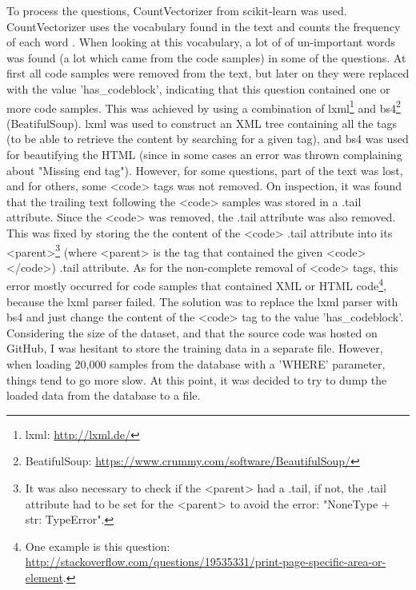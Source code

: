 \noindent
To process the questions, CountVectorizer from scikit-learn was used. 
CountVectorizer uses the vocabulary found in the text and counts the frequency of each word \cite{Scikitlearn.org2016b} \cite[see~4.2.3]{Scikitlearn.org2016}. 
When looking at this vocabulary, a lot of of un-important words was found (a lot which came from the code samples) in some of the questions. 
At first all code samples were removed from the text, but later on they were replaced with the value 'has\_codeblock', indicating that this question contained one or more code samples. 
This was achieved by using a combination of lxml\footnote{lxml: \url{http://lxml.de/}} and bs4\footnote{BeatifulSoup: \url{https://www.crummy.com/software/BeautifulSoup/}} (BeatifulSoup). 
lxml was used to construct an XML tree containing all the tags (to be able to retrieve the content by searching for a given tag), and bs4 was used for beautifying the HTML 
(since in some cases an error was thrown complaining about "Missing end tag").
\vspace{0.5em}\newline
However, for some questions, part of the text was lost, and for others, some <code> tags was not removed. 
On inspection, it was found that the trailing text following the <code> samples was stored in a .tail attribute. 
Since the <code> was removed, the .tail attribute was also removed. 
This was fixed by storing the the content of the <code> .tail attribute into its <parent>\footnote{
	It was also necessary to check if the <parent> had a .tail, if not, the .tail attribute had to be set for the <parent> to avoid the error: 
	"NoneType + str: TypeError".
	} 
(where <parent> is the tag that contained the given <code></code>) .tail attribute. 
As for the non-complete removal of <code> tags, this error mostly occurred for code samples that contained XML or HTML code\footnote{
	One example is this question: \\
	\url{http://stackoverflow.com/questions/19535331/print-page-specific-area-or-element}.
	}, 
because the lxml parser failed. 
The solution was to replace the lxml parser with bs4 and just change the content of the <code> tag to the value 'has\_codeblock'.
\vspace{0.5em}\newline
Considering the size of the dataset, and that the source code was hosted on GitHub, I was hesitant to store the training data in a separate file. 
However, when loading 20,000 samples from the database with a 'WHERE' parameter, things tend to go more slow. 
At this point, it was decided to try to dump the loaded data from the database to a file. 
